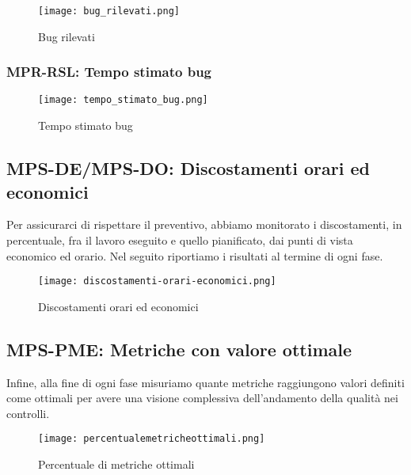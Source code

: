 \documentclass[../piano-di-qualifica.tex]{subfiles}
\begin{document}
\begin{figure}[H]
  \centering
  \texttt{[image: bug\_rilevati.png]}%
  \caption{Bug rilevati}%
  \label{fig:bug_rilevati}%
\end{figure}

\subsubsection{MPR-RSL\@: Tempo stimato bug}%
\label{subs:tempo_stimato}

\begin{figure}[H]
  \centering
  \texttt{[image: tempo\_stimato\_bug.png]}%
  \caption{Tempo stimato bug}%
  \label{fig:tempo_stimato_bug}%
\end{figure}


\newpage

\subsection{MPS-DE/MPS-DO\@: Discostamenti orari ed economici}%
\label{sub:discostamenti_orari_ed_economici}
Per assicurarci di rispettare il preventivo, abbiamo monitorato i discostamenti, in percentuale, fra il lavoro eseguito e quello pianificato, dai punti di vista economico ed orario. Nel seguito riportiamo i risultati al termine di ogni fase.

\begin{figure}[H]
  \centering
  \texttt{[image: discostamenti-orari-economici.png]}%
  \caption{Discostamenti orari ed economici}%
  \label{fig:discostamenti_orari_economici}%
\end{figure}

\subsection{MPS-PME\@: Metriche con valore ottimale}%
\label{sub:metriche_ottimali}
Infine, alla fine di ogni fase misuriamo quante metriche raggiungono valori definiti come ottimali per avere una visione complessiva dell'andamento della qualità nei controlli.
\begin{figure}[H]
  \centering
  \texttt{[image: percentualemetricheottimali.png]}%
  \caption{Percentuale di metriche ottimali}%
  \label{fig:metriche_ottimali}%
\end{figure}

\newpage
\end{document}
